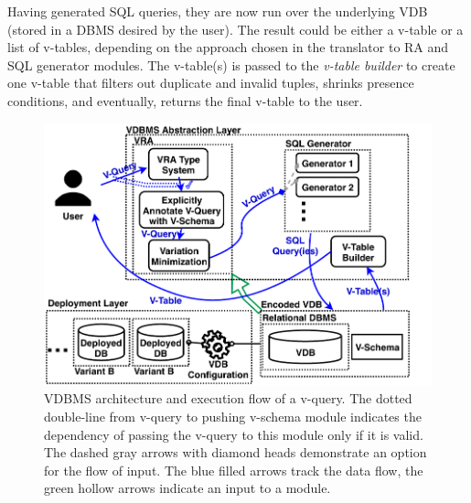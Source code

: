 Having generated SQL queries, they are now run over the underlying 
VDB (stored in a DBMS desired by the user). The result could be either 
a v-table or a list of v-tables, depending on the approach chosen in 
the translator to RA and SQL generator modules. The v-table(s) is passed
to the \emph{v-table builder}
to create one v-table that filters out 
duplicate and invalid tuples, shrinks presence conditions, and 
eventually, returns the final v-table to the user.

\begin{figure}
\centering
\includegraphics[scale = 0.7] {figs/arch8.pdf}
\caption{VDBMS architecture and execution flow of a v-query. 
The dotted double-line from v-query to pushing v-schema module
indicates the dependency of passing the v-query to this module
only if it is valid. 
The dashed gray arrows with diamond heads demonstrate
an option for the flow of input. 
The blue filled arrows track the data flow, the green hollow arrows 
indicate an input to a module.}
\label{fig:arch}
\end{figure}


